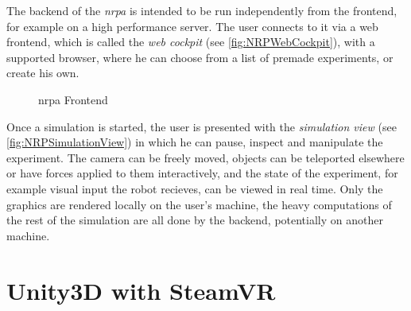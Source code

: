 The backend of the \textit{\gls{nrpa}} is intended to be run independently from the frontend, for example on a high performance server. The user connects to it via a web frontend, which is called the \textit{web cockpit} (see \autoref{fig:NRPWebCockpit}), with a supported browser, where he can choose from a list of premade experiments, or create his own.
\begin{figure} [h]
    \centering
    \hfill
    \caption{\gls{nrpa} Frontend}
    \label{fig:NRPFrontend}
\end{figure}
Once a simulation is started, the user is presented with the \textit{simulation view} (see \autoref{fig:NRPSimulationView}) in which he can pause, inspect and manipulate the experiment. The camera can be freely moved, objects can be teleported elsewhere or have forces applied to them interactively, and the state of the experiment, for example visual input the robot recieves, can be viewed in real time.
\newline
Only the graphics are rendered locally on the user's machine, the heavy computations of the rest of the simulation are all done by the backend, potentially on another machine.


\section{Unity3D with SteamVR}

